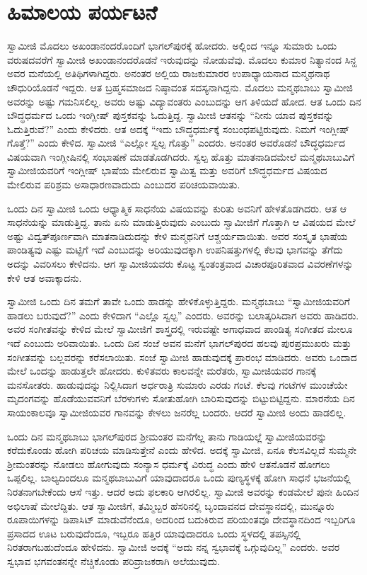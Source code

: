 
\chapter{ಹಿಮಾಲಯ ಪರ್ಯಟನೆ}

ಸ್ವಾಮೀಜಿ ಮೊದಲು ಅಖಂಡಾನಂದರೊಂದಿಗೆ ಭಾಗಲ್‍ಪುರಕ್ಕೆ ಹೋದರು. ಅಲ್ಲಿಂದ ಇನ್ನೂ ಸುಮಾರು ಒಂದು ವರುಷದವರೆಗೆ ಸ್ವಾಮೀಜಿ ಅಖಂಡಾನಂದರೊಡನೆ ಇರುವುದನ್ನು ನೋಡುವೆವು. ಮೊದಲು ಕುಮಾರ ನಿತ್ಯಾನಂದ ಸಿನ್ಹ ಅವರ ಮನೆಯಲ್ಲಿ ಅತಿಥಿಗಳಾಗಿದ್ದರು. ಅನಂತರ ಅಲ್ಲಿಯ ರಾಜಕುಮಾರರ ಉಪಾಧ್ಯಾಯನಾದ ಮನ್ಮಥನಾಥ ಚೌಧುರಿಯೊಡನೆ ಇದ್ದರು. ಆತ ಬ್ರಹ್ಮಸಮಾಜದ ನಿಷ್ಠಾವಂತ ಸದಸ್ಯನಾಗಿದ್ದನು. ಮೊದಲು ಮನ್ಮಥಬಾಬು ಸ್ವಾಮೀಜಿ ಅವರನ್ನು ಅಷ್ಟು ಗಮನಿಸಲಿಲ್ಲ. ಅವರು ಅಷ್ಟು ವಿದ್ಯಾವಂತರು ಎಂಬುದನ್ನು ಆಗ ತಿಳಿಯದೆ ಹೋದ. ಆತ ಒಂದು ದಿನ ಬೌದ್ಧಧರ್ಮದ ಒಂದು ಇಂಗ್ಲೀಷ್ ಪುಸ್ತಕವನ್ನು ಓದುತ್ತಿದ್ದ. ಸ್ವಾಮೀಜಿ ಆತನನ್ನು “ನೀನು ಯಾವ ಪುಸ್ತಕವನ್ನು ಓದುತ್ತಿರುವೆ?” ಎಂದು ಕೇಳಿದರು. ಆತ ಅದಕ್ಕೆ “ಇದು ಬೌದ್ಧಧರ್ಮಕ್ಕೆ ಸಂಬಂಧಪಟ್ಟಿರುವುದು. ನಿಮಗೆ ಇಂಗ್ಲೀಷ್ ಗೊತ್ತೆ?” ಎಂದು ಕೇಳಿದ. ಸ್ವಾಮೀಜಿ “ಎಲ್ಲೋ ಸ್ವಲ್ಪ ಗೊತ್ತು” ಎಂದರು. ಅನಂತರ ಅವರೊಡನೆ ಬೌದ್ಧಧರ್ಮದ ವಿಷಯವಾಗಿ ಇಂಗ್ಲೀಷಿನಲ್ಲಿ ಸಂಭಾಷಣೆ ಮಾಡತೊಡಗಿದರು. ಸ್ವಲ್ಪ ಹೊತ್ತು ಮಾತನಾಡಿದಮೇಲೆ ಮನ್ಮಥಬಾಬುವಿಗೆ ಸ್ವಾಮೀಜಿಯವರಿಗೆ ಇಂಗ್ಲೀಷ್ ಭಾಷೆಯ ಮೇಲಿರುವ ಸ್ವಾಮಿತ್ವ ಮತ್ತು ಅವರಿಗೆ ಬೌದ್ಧಧರ್ಮದ ವಿಷಯದ ಮೇಲಿರುವ ಪರಿಶ್ರಮ ಅಸಾಧಾರಣವಾದುದು ಎಂಬುದರ ಪರಿಚಯವಾಯಿತು. 

ಒಂದು ದಿನ ಸ್ವಾಮೀಜಿ ಒಂದು ಆಧ್ಯಾತ್ಮಿಕ ಸಾಧನೆಯ ವಿಷಯವನ್ನು ಕುರಿತು ಅವನಿಗೆ ಹೇಳತೊಡಗಿದರು. ಆತ ಆ ಸಾಧನೆಯನ್ನು ಮಾಡುತ್ತಿದ್ದ. ತಾನು ಏನು ಮಾಡುತ್ತಿರುವುದು ಎಂಬುದು ಸ್ವಾಮೀಜಿಗೆ ಗೊತ್ತಾಗಿ ಆ ವಿಷಯದ ಮೇಲೆ ಅಷ್ಟು ವಿದ್ವತ್‍ಪೂರ್ಣವಾಗಿ ಮಾತನಾಡಿದುದನ್ನು ಕೇಳಿ ಮನ್ಮಥನಿಗೆ ಆಶ್ಚರ್ಯವಾಯಿತು. ಅವರ ಸಂಸ್ಕೃತ ಭಾಷೆಯ ಪಾಂಡಿತ್ಯವು ಎಷ್ಟು ಮಟ್ಟಿಗೆ ಇದೆ ಎಂಬುದನ್ನು ಅರಿಯುವುದಕ್ಕಾಗಿ ಉಪನಿಷತ್ತುಗಳಲ್ಲಿ ಕೆಲವು ಭಾಗವನ್ನು ತೆಗೆದು ಅದನ್ನು ವಿವರಿಸಲು ಕೇಳಿದನು. ಆಗ ಸ್ವಾಮೀಜಿಯವರು ಕೊಟ್ಟ ಸ್ವಂತಂತ್ರವಾದ ವಿಚಾರಪೂರಿತವಾದ ವಿವರಣೆಗಳನ್ನು ಕೇಳಿ ಆತ ಅವಾಕ್ಕಾದನು. 

ಸ್ವಾಮೀಜಿ ಒಂದು ದಿನ ತಮಗೆ ತಾವೇ ಒಂದು ಹಾಡನ್ನು ಹೇಳಿಕೊಳ್ಳುತ್ತಿದ್ದರು. ಮನ್ಮಥಬಾಬು “ಸ್ವಾಮೀಜಿಯವರಿಗೆ ಹಾಡಲು ಬರುವುದೆ?” ಎಂದು ಕೇಳಿದಾಗ “ಎಲ್ಲೊ ಸ್ವಲ್ಪ” ಎಂದರು. ಅವರನ್ನು ಬಲಾತ್ಕರಿಸಿದಾಗ ಅವರು ಹಾಡಿದರು. ಅವರ ಸಂಗೀತವನ್ನು ಕೇಳಿದ ಮೇಲೆ ಸ್ವಾಮೀಜಿಗೆ ಶಾಸ್ತ್ರದಲ್ಲಿ ಇರುವಷ್ಟೇ ಅಗಾಧವಾದ ಪಾಂಡಿತ್ಯ ಸಂಗೀತದ ಮೇಲೂ ಇದೆ ಎಂಬುದು ಅರಿವಾಯಿತು. ಒಂದು ದಿನ ಸಂಜೆ ಅವನ ಮನೆಗೆ ಭಾಗಲ್‍ಪುರದ ಹಲವು ಪುರಪ್ರಮುಖರು ಮತ್ತು ಸಂಗೀತವನ್ನು ಬಲ್ಲವರನ್ನು ಕರೆಸಲಾಯಿತು. ಸಂಜೆ ಸ್ವಾಮೀಜಿ ಹಾಡುವುದಕ್ಕೆ ಪ್ರಾರಂಭ ಮಾಡಿದರು. ಅವರು ಒಂದಾದ ಮೇಲೆ ಒಂದನ್ನು ಹಾಡುತ್ತಲೇ ಹೋದರು. ಕುಳಿತವರು ಕಾಲವನ್ನೇ ಮರೆತರು, ಸ್ವಾಮೀಜಿಯವರ ಗಾನಕ್ಕೆ ಮನಸೋತರು. ಹಾಡುವುದನ್ನು ನಿಲ್ಲಿಸಿದಾಗ ಅರ್ಧರಾತ್ರಿ ಸುಮಾರು ಎರಡು ಗಂಟೆ. ಕೆಲವು ಗಂಟೆಗಳ ಮುಂಚೆಯೇ ಮೃದಂಗವನ್ನು ಹೊಡೆಯುವವನಿಗೆ ಬೆರಳುಗಳು ಸೋತುಹೋಗಿ ಬಾರಿಸುವುದನ್ನು ಬಿಟ್ಟುಬಿಟ್ಟಿದ್ದನು. ಮಾರನೆಯ ದಿನ ಸಾಯಂಕಾಲವೂ ಸ್ವಾಮೀಜಿಯವರ ಗಾನವನ್ನು ಕೇಳಲು ಜನರೆಲ್ಲ ಬಂದರು. ಆದರೆ ಸ್ವಾಮೀಜಿ ಅಂದು ಹಾಡಲಿಲ್ಲ. 

ಒಂದು ದಿನ ಮನ್ಮಥಬಾಬು ಭಾಗಲ್‍ಪುರದ ಶ‍್ರೀಮಂತರ ಮನೆಗೆಲ್ಲ ತಾನು ಗಾಡಿಯಲ್ಲೆ ಸ್ವಾಮೀಜಿಯವರನ್ನು ಕರೆದುಕೊಂಡು ಹೋಗಿ ಪರಿಚಯ ಮಾಡಿಸುತ್ತೇನೆ ಎಂದು ಹೇಳಿದ. ಅದಕ್ಕೆ ಸ್ವಾಮೀಜಿ, ಏನೂ ಕೆಲಸವಿಲ್ಲದೆ ಸುಮ್ಮನೇ ಶ‍್ರೀಮಂತರನ್ನು ನೋಡಲು ಹೋಗುವುದು ಸಂನ್ಯಾಸ ಧರ್ಮಕ್ಕೆ ವಿರುದ್ಧ ಎಂದು ಹೇಳಿ ಆತನೊಡನೆ ಹೋಗಲು ಒಪ್ಪಲಿಲ್ಲ. ಬಾಲ್ಯದಿಂದಲೂ ಮನ್ಮಥಬಾಬುವಿಗೆ ಯಾವುದಾದರೂ ಒಂದು ಪುಣ್ಯಸ್ಥಳಕ್ಕೆ ಹೋಗಿ ಸಾಧನೆ ಭಜನೆಯಲ್ಲಿ ನಿರತನಾಗಬೇಕೆಂದು ಆಸೆ ಇತ್ತು. ಆದರೆ ಅದು ಫಲಕಾರಿ ಆಗಿರಲಿಲ್ಲ. ಸ್ವಾಮೀಜಿ ಅವರನ್ನು ಕಂಡಮೇಲೆ ಪುನಃ ಹಿಂದಿನ ಅಭಿಲಾಷೆ ಮೇಲೆದ್ದಿತು. ಆತ ಸ್ವಾಮೀಜಿಗೆ, ತಮ್ಮಿಬ್ಬರ ಹೆಸರಿನಲ್ಲಿ ಬೃಂದಾವನದ ದೇವಸ್ಥಾನದಲ್ಲಿ, ಮುನ್ನೂರು ರೂಪಾಯಿಗಳನ್ನು ಡಿಪಾಸಿಟ್ ಮಾಡುವೆನೆಂದೂ, ಅದರಿಂದ ಬದುಕಿರುವ ಪರಿಯಂತವೂ ದೇವಸ್ಥಾನದಿಂದ ಇಬ್ಬರಿಗೂ ಪ್ರಸಾದದ ಊಟ ಬರುವುದೆಂದೂ, ಇಬ್ಬರೂ ಹತ್ತಿರ ಯಾವುದಾದರೂ ಒಂದು ಸ್ಥಳದಲ್ಲಿ ತಪಸ್ಸಿನಲ್ಲಿ ನಿರತರಾಗಬಹುದೆಂದೂ ಹೇಳಿದನು. ಸ್ವಾಮೀಜಿ ಅದಕ್ಕೆ “ಅದು ನನ್ನ ಸ್ವಭಾವಕ್ಕೆ ಒಗ್ಗುವುದಿಲ್ಲ” ಎಂದರು. ಅವರ ಸ್ವಭಾವ ಭಗವಂತನನ್ನೇ ನೆಚ್ಚಿಕೊಂಡು ಪರಿವ್ರಾಜಕರಾಗಿ ಅಲೆಯುವುದು. 

